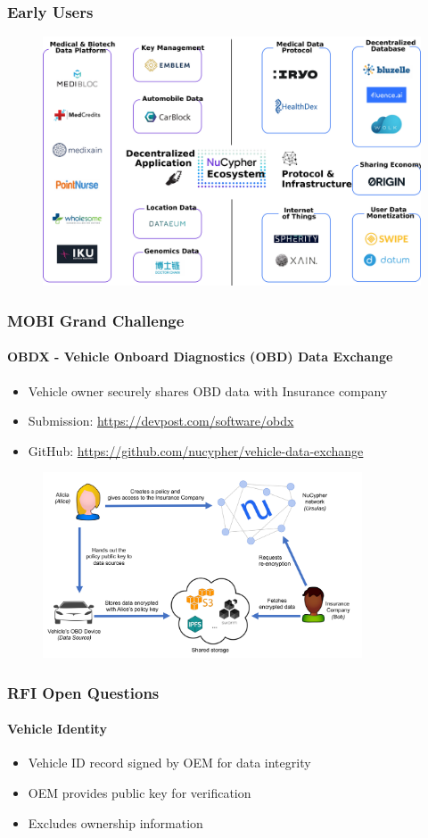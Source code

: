 \documentclass[xetex,mathsans,sans,aspectratio=169]{beamer}
\begin{document}
    \begin{frame}
      \frametitle{Early Users}
      \begin{figure}
           \includegraphics[width=11.5cm]{pdf/projects.pdf}
      \end{figure}
    \end{frame}

    \begin{frame}
      \frametitle{MOBI Grand Challenge}
      \framesubtitle{OBDX - Vehicle Onboard Diagnostics (OBD) Data Exchange}
      \begin{itemize}
        \item Vehicle owner securely shares OBD data with Insurance company
        \item Submission: \url{https://devpost.com/software/obdx}
        \item GitHub: \url{https://github.com/nucypher/vehicle-data-exchange}
      \end{itemize}
      \begin{figure}
        \centering
        \includegraphics[height=5.5cm]{pdf/vehicle-data-exchange.png}
      \end{figure}
    \end{frame}

    \begin{frame}
      \frametitle{RFI Open Questions}
      \framesubtitle{Vehicle Identity}
      \begin{itemize}
        \setlength\itemsep{1em}
        \item Vehicle ID record signed by OEM for data integrity
        \item OEM provides public key for verification
        \item Excludes ownership information
      \end{itemize}
    \end{frame}
\end{document}
